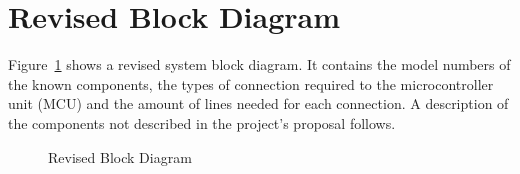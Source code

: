 \section{Revised Block Diagram}

Figure~\ref{fig:blockDiagram} shows a revised system block diagram.  It contains the model numbers of the known components, the types of connection required to the microcontroller unit (MCU) and the amount of lines needed for each connection.  A description of the components not described in the project's proposal follows.

\begin{figure}[H]
	\centering
	\caption{Revised Block Diagram \label{fig:blockDiagram}}
\end{figure}
